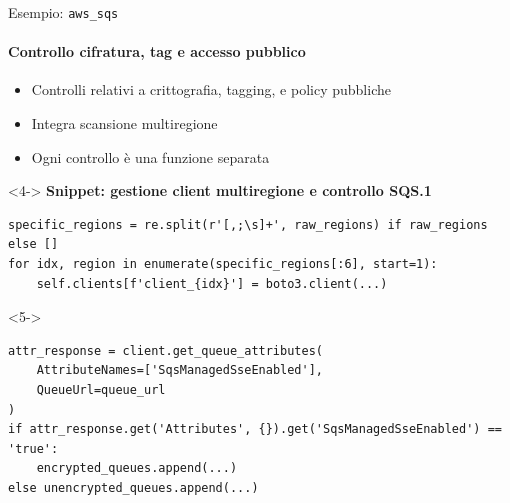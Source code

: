 \documentclass{beamer}
\begin{document}
\begin{frame}[fragile]{Esempio: \texttt{aws\_sqs}}
\framesubtitle{Controllo cifratura, tag e accesso pubblico}
\begin{itemize}
    \item<1-> Controlli relativi a crittografia, tagging, e policy pubbliche
    \item<2-> Integra scansione multiregione
    \item<3-> Ogni controllo è una funzione separata
\end{itemize}

\begin{onlyenv}<4->
\textbf{Snippet: gestione client multiregione e controllo SQS.1}
\begin{lstlisting}[style=statalepython, basicstyle=\scriptsize\ttfamily]
specific_regions = re.split(r'[,;\s]+', raw_regions) if raw_regions else []
for idx, region in enumerate(specific_regions[:6], start=1):
    self.clients[f'client_{idx}'] = boto3.client(...)
\end{lstlisting}
\end{onlyenv}
\begin{onlyenv}<5->
\begin{lstlisting}[style=statalepython, basicstyle=\scriptsize\ttfamily]
attr_response = client.get_queue_attributes(
    AttributeNames=['SqsManagedSseEnabled'],
    QueueUrl=queue_url
)
if attr_response.get('Attributes', {}).get('SqsManagedSseEnabled') == 'true':
    encrypted_queues.append(...)
else unencrypted_queues.append(...)
\end{lstlisting}
\end{onlyenv}
\end{frame}
\end{document}
